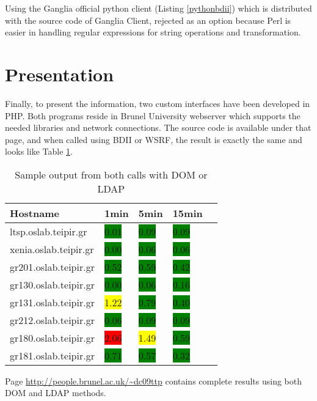 Using the Ganglia official python client (Listing \ref{pythonbdii}) which is distributed with the source code of Ganglia Client, rejected as an option because Perl is easier in handling regular expressions for string operations and transformation.

\section{Presentation}

Finally, to present the information, two custom interfaces have been developed in PHP. Both programs reside in Brunel University webserver which supports the needed libraries and network connections. The source code is available under that page, and when called using BDII or WSRF, the result is exactly the same and looks like Table \ref{tab:html_output}.

\begin{table}[ht]
\centering
\begin{tabular}{ | l | l | l | l | l |}
\hline
 Hostname & 1min & 5min & 15min \\ \hline
 ltsp.oslab.teipir.gr & \colorbox{green}{0.01} & \colorbox{green}{0.09} & \colorbox{green}{0.09} \\ \hline
 xenia.oslab.teipir.gr & \colorbox{green}{0.00} & \colorbox{green}{0.06} & \colorbox{green}{0.06} \\ \hline
 gr201.oslab.teipir.gr & \colorbox{green}{0.52} & \colorbox{green}{0.59} & \colorbox{green}{0.42} \\ \hline
 gr130.oslab.teipir.gr & \colorbox{green}{0.00} & \colorbox{green}{0.06} & \colorbox{green}{0.16} \\ \hline
 gr131.oslab.teipir.gr & \colorbox{yellow}{1.22} & \colorbox{green}{0.79} & \colorbox{green}{0.40} \\ \hline
 gr212.oslab.teipir.gr & \colorbox{green}{0.06} & \colorbox{green}{0.09} & \colorbox{green}{0.09} \\ \hline
 gr180.oslab.teipir.gr & \colorbox{red}{2.06} & \colorbox{yellow}{1.49} & \colorbox{green}{0.59} \\ \hline
 gr181.oslab.teipir.gr & \colorbox{green}{0.71} & \colorbox{green}{0.57} & \colorbox{green}{0.32} \\ \hline
\end{tabular}
\caption{Sample output from both calls with DOM or LDAP}
\label{tab:html_output}
\end{table}

Page \url{http://people.brunel.ac.uk/~dc09ttp} contains complete results using both DOM and LDAP methods.


